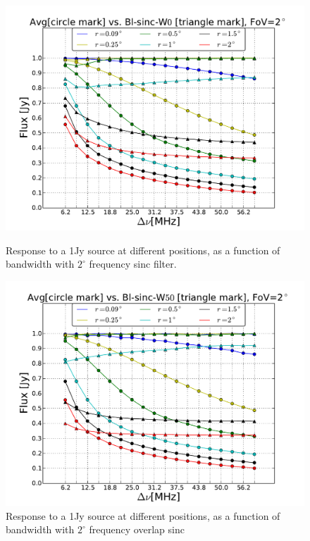 \documentclass[useAMS,usenatbib]{mn2e}
\begin{document}
  \begin{figure}
    \centering
  \begin{minipage}{0.36\linewidth}\includegraphics[width=1\textwidth]{./Figures/max-integ-freq-sinc-w1x1-fov2.pdf}
    \caption{Response to a 1Jy source at different positions, as a function of  bandwidth with $2^{\circ}$ frequency sinc filter.}
    \label{fig:max-integ-freq-sinc-w1x1-fov2}
  \end{minipage}
  \hspace{1cm}
  \begin{minipage}{0.36\linewidth}\includegraphics[width=1\textwidth]{./Figures/max-integ-freq-sinc-w1x50-fov2.pdf}
        \caption{Response to a 1Jy source at different positions, as a function of bandwidth with $2^{\circ}$ frequency overlap sinc 
}
\end{minipage}
\end{figure}
\end{document}

